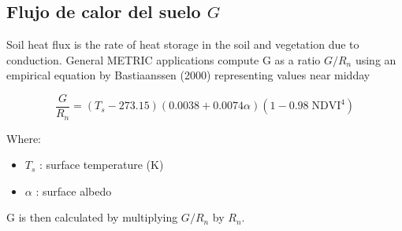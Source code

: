 \newpage

\subsection{Flujo de calor del suelo $G$}

Soil heat flux is the rate of heat storage in the soil and vegetation due to conduction. General METRIC applications compute G as a ratio $G/R_n$ using an empirical equation by Bastiaanssen (2000) representing values near midday

\begin{equation}
\frac{G}{R_n} = ( T_s - 273.15 ) (0.0038 + 0.0074 \alpha ) (1-0.98 \; \text{NDVI}^4) %
\label{eq:1}
\end{equation}

Where:
\begin{itemize}
    \item $T_s$ : surface temperature (K)
    \item $\alpha$ : surface albedo
\end{itemize}

G is then calculated by multiplying $G/R_n$ by $R_n$. 

